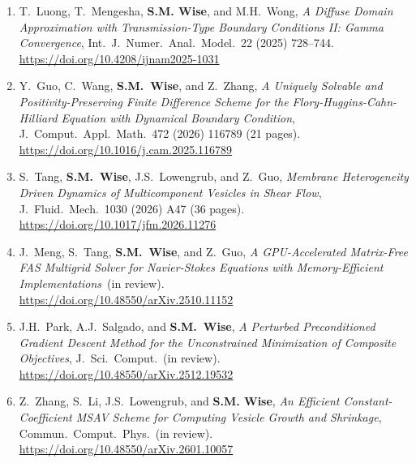 \documentclass[11pt]{letter}
\begin{document}
\begin{enumerate}
	\item
T.~Luong, T.~Mengesha, \textbf{S.M. Wise}, and M.H.~Wong, {\sl  A Diffuse Domain Approximation with Transmission-Type Boundary Conditions II: Gamma Convergence}, Int.~J.~Numer.~Anal.~Model.~22 (2025) 728--744.
	\\
\url{https://doi.org/10.4208/ijnam2025-1031}

	\item
Y.~Guo, C.~Wang, \textbf{S.M.~Wise}, and Z.~Zhang, {\sl A Uniquely Solvable and Positivity-Preserving Finite Difference Scheme for the Flory-Huggins-Cahn-Hilliard Equation with Dynamical Boundary Condition}, J.~Comput.~Appl.~Math.~472 (2026) 116789 (21 pages).
	\\
\url{https://doi.org/10.1016/j.cam.2025.116789}

	\item
S.~Tang, \textbf{S.M.~Wise}, J.S.~Lowengrub, and Z.~Guo, {\sl Membrane Heterogeneity Driven Dynamics of Multicomponent Vesicles in Shear
Flow}, J.~Fluid.~Mech.~1030 (2026) A47 (36 pages).
	\\
\url{https://doi.org/10.1017/jfm.2026.11276}

	\item
J.~Meng, S.~Tang, \textbf{S.M.~Wise}, and Z.~Guo, {\sl A GPU-Accelerated Matrix-Free FAS Multigrid Solver for Navier-Stokes Equations with Memory-Efficient Implementations}~(in review).
	\\
\url{https://doi.org/10.48550/arXiv.2510.11152}

	\item
J.H.~Park, A.J.~Salgado, and \textbf{S.M.~Wise}, {\sl A Perturbed Preconditioned Gradient Descent Method for the Unconstrained Minimization of Composite Objectives}, J.~Sci.~Comput.~(in review). 
	\\
\url{https://doi.org/10.48550/arXiv.2512.19532}

	\item
Z.~Zhang, S.~Li, J.S.~Lowengrub, and \textbf{S.M. Wise}, {\sl An Efficient Constant-Coefficient MSAV Scheme for Computing Vesicle Growth and Shrinkage}, Commun.~Comput.~Phys.~(in review).
	\\
\url{https://doi.org/10.48550/arXiv.2601.10057}

	\end{enumerate}
	

	
\end{document}
